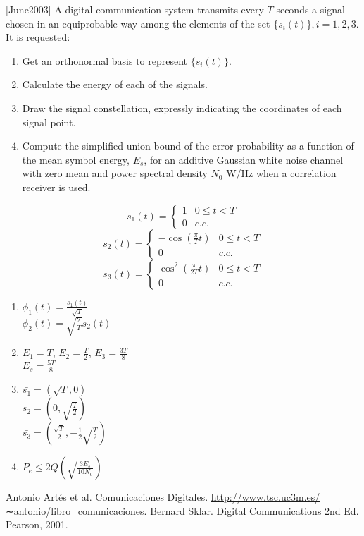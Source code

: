 \documentclass[es,boletin]{uah}
\begin{document}
{
	[June2003] A digital communication system transmits every $T$ seconds a signal chosen in an equiprobable way among the elements of the set $\{s_i(t)\}, i=1,2,3$. It is requested:

\begin{enumerate}
	\item Get an orthonormal basis to represent $\{s_i(t)\}$.
   	\item Calculate the energy of each of the signals.
    \item Draw the signal constellation, expressly indicating the coordinates of each signal point.
    \item Compute the simplified union bound of the error probability as a function of the mean symbol energy, $E_s$, for an additive Gaussian white noise channel with zero mean and power spectral density $N_0$ W/Hz when a correlation receiver is used.
\end{enumerate}

\begin{displaymath}
	s_1(t) = \left \{ \begin{array}{ll} 1 & 0\leq t < T \\ 0 & c.c. \end{array} \right .
\end{displaymath}
\begin{displaymath}
	s_2(t) = \left \{ \begin{array}{ll} -\cos\left ( \frac{\pi}{T}t \right ) & 0\leq t < T \\ 0 & c.c. \end{array} \right .
\end{displaymath}
\begin{displaymath}
	s_3(t) = \left \{ \begin{array}{ll} \cos^2 \left ( \frac{\pi}{2T}t \right ) & 0\leq t < T \\ 0 & c.c. \end{array} \right .
\end{displaymath}

}
{
	\begin{enumerate}
		\item $\phi_1(t) = \frac{s_1(t)}{\sqrt{T}}$ \\
				$\phi_2(t) = \sqrt{\frac{2}{T}}s_2(t)$\\
		\item $E_1=T$, $E_2 = \frac{T}{2}$, $E_3 = \frac{3T}{8}$\\
				$E_s = \frac{5T}{8}$
		\item $\bar{s_1} = (\sqrt{T},0)$ \\
		$\bar{s_2} = (0, \sqrt{\frac{T}{2}})$ \\
		$\bar{s_3} = (\frac{\sqrt{T}}{2},-\frac{1}{2}\sqrt{\frac{T}{2}})$ \\
		\item $P_e \leq 2Q \left ( \sqrt{\frac{3 E_s}{10 N_0}} \right )$
	\end{enumerate}
}

\newpage
\begin{thebibliography}{100}
	 Antonio Artés et al. Comunicaciones Digitales. \url{http://www.tsc.uc3m.es/∼antonio/libro_comunicaciones}.
	 Bernard Sklar. Digital Communications 2nd Ed. Pearson, 2001.
	\end{thebibliography}
	
	
\end{document}
